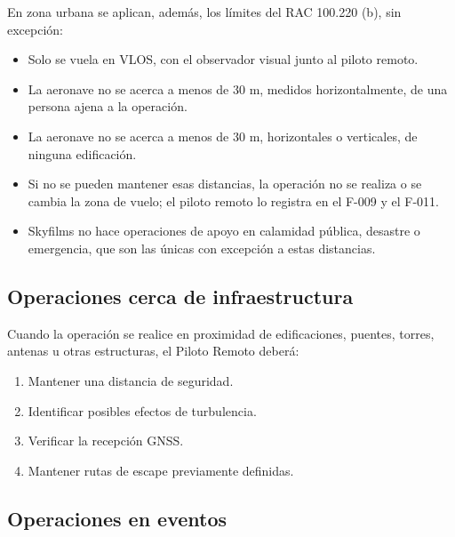 En zona urbana se aplican, además, los límites del RAC 100.220 (b), sin excepción:

\begin{itemize}

\item Solo se vuela en VLOS, con el observador visual junto al piloto remoto.

\item La aeronave no se acerca a menos de 30 m, medidos horizontalmente, de una persona ajena a la operación.

\item La aeronave no se acerca a menos de 30 m, horizontales o verticales, de ninguna edificación.

\item Si no se pueden mantener esas distancias, la operación no se realiza o se cambia la zona de vuelo; el piloto remoto lo registra en el F-009 y el F-011.

\item Skyfilms no hace operaciones de apoyo en calamidad pública, desastre o emergencia, que son las únicas con excepción a estas distancias.

\end{itemize}

\subsection{Operaciones cerca de infraestructura}

Cuando la operación se realice en proximidad de edificaciones, puentes, torres, antenas u otras estructuras, el Piloto Remoto deberá:

\begin{enumerate}

\item Mantener una distancia de seguridad.

\item Identificar posibles efectos de turbulencia.

\item Verificar la recepción GNSS.

\item Mantener rutas de escape previamente definidas.

\end{enumerate}


\subsection{Operaciones en eventos}

